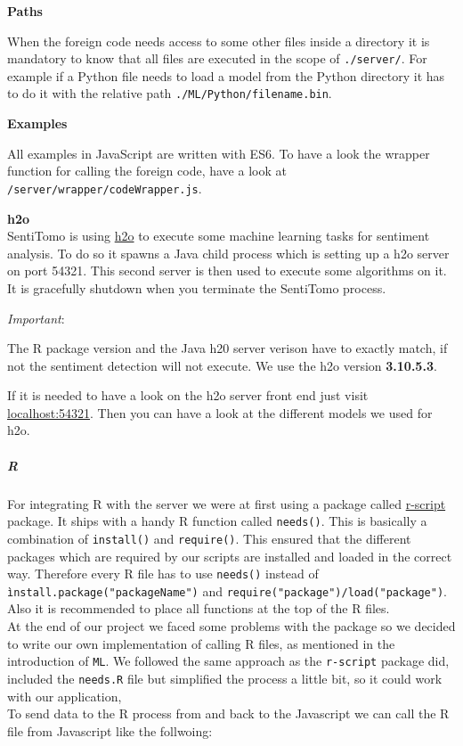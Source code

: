 \documentclass[]{article}
\let\oldsubparagraph\subparagraph
\renewcommand{\subparagraph}[1]{\oldsubparagraph{#1}\mbox{}}
\begin{document}
\textbf{Paths}

When the foreign code needs access to some other files inside a
directory it is mandatory to know that all files are executed in the
scope of \texttt{./server/}. For example if a Python file needs to load
a model from the Python directory it has to do it with the relative path
\texttt{./ML/Python/filename.bin}.

\textbf{Examples}

All examples in JavaScript are written with ES6. To have a look the
wrapper function for calling the foreign code, have a look at
\texttt{/server/wrapper/codeWrapper.js}.

\textbf{h2o}\\
SentiTomo is using \href{https://www.h2o.ai/h2o/}{h2o} to execute some
machine learning tasks for sentiment analysis. To do so it spawns a Java
child process which is setting up a h2o server on port 54321. This
second server is then used to execute some algorithms on it. It is
gracefully shutdown when you terminate the SentiTomo process.

\emph{Important}:

The R package version and the Java h20 server verison have to exactly
match, if not the sentiment detection will not execute. We use the h2o
version \textbf{3.10.5.3}.

If it is needed to have a look on the h2o server front end just visit
\url{localhost:54321}. Then you can have a look at the different models
we used for h2o.

\subparagraph{R}\label{r}

For integrating R with the server we were at first using a package
called \href{https://github.com/joshkatz/r-script}{r-script} package. It
ships with a handy R function called \texttt{needs()}. This is basically
a combination of \texttt{install()} and \texttt{require()}. This ensured
that the different packages which are required by our scripts are
installed and loaded in the correct way. Therefore every R file has to
use \texttt{needs()} instead of \texttt{ìnstall.package("packageName")}
and \texttt{require("package")/load("package")}. Also it is recommended
to place all functions at the top of the R files.\\
At the end of our project we faced some problems with the package so we
decided to write our own implementation of calling R files, as mentioned
in the introduction of \texttt{ML}. We followed the same approach as the
\texttt{r-script} package did, included the \texttt{needs.R} file but
simplified the process a little bit, so it could work with our
application,\\
To send data to the R process from and back to the Javascript we can
call the R file from Javascript like the follwoing:
\end{document}
